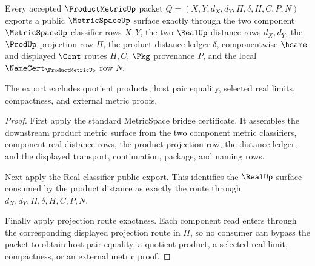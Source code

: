 \begin{theorem}
\label{thm:productmetric-public-metricspace-export}
Every accepted $\ProductMetricUp$ packet $Q=(X,Y,d_X,d_Y,\Pi,\delta,H,C,P,N)$ exports a public $\MetricSpaceUp$ surface exactly through the two component $\MetricSpaceUp$ classifier rows $X,Y$, the two $\RealUp$ distance rows $d_X,d_Y$, the $\ProdUp$ projection row $\Pi$, the product-distance ledger $\delta$, componentwise $\hsame$ and displayed $\Cont$ routes $H,C$, $\Pkg$ provenance $P$, and the local $\NameCert_{\ProductMetricUp}$ row $N$.

The export excludes quotient products, host pair equality, selected real limits, compactness, and external metric proofs.
\end{theorem}
\begin{proof}
First apply the standard MetricSpace bridge certificate. It assembles the downstream product metric surface from the two component metric classifiers, component real-distance rows, the product projection row, the distance ledger, and the displayed transport, continuation, package, and naming rows.

Next apply the Real classifier public export. This identifies the $\RealUp$ surface consumed by the product distance as exactly the route through $d_X,d_Y,\Pi,\delta,H,C,P,N$.

Finally apply projection route exactness. Each component read enters through the corresponding displayed projection route in $\Pi$, so no consumer can bypass the packet to obtain host pair equality, a quotient product, a selected real limit, compactness, or an external metric proof.
\end{proof}

